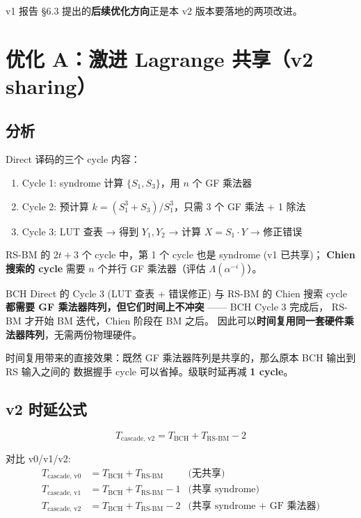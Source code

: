 \documentclass[11pt,a4paper]{article}
\begin{document}
v1 报告 §6.3 提出的\textbf{后续优化方向}正是本 v2 版本要落地的两项改进。

\section{优化 A：激进 Lagrange 共享（v2 sharing）}

\subsection{分析}

Direct 译码的三个 cycle 内容：
\begin{enumerate}[leftmargin=1.5em, itemsep=1pt]
\item Cycle 1: syndrome 计算 $\{S_1, S_3\}$，用 $n$ 个 GF 乘法器
\item Cycle 2: 预计算 $k = (S_1^3 + S_3)/S_1^3$，只需 3 个 GF 乘法 + 1 除法
\item Cycle 3: LUT 查表 → 得到 $Y_1, Y_2$ → 计算 $X = S_1 \cdot Y$ → 修正错误
\end{enumerate}

RS-BM 的 $2t+3$ 个 cycle 中，第 1 个 cycle 也是 syndrome (v1 已共享)；
\textbf{Chien 搜索的 cycle} 需要 $n$ 个并行 GF 乘法器（评估 $\Lambda(\alpha^{-i})$）。

\begin{keybox}[title=\textbf{v2 共享的核心观察}]
BCH Direct 的 Cycle 3 (LUT 查表 + 错误修正) 与 RS-BM 的 Chien 搜索 cycle
\textbf{都需要 GF 乘法器阵列，但它们时间上不冲突} —— BCH Cycle 3 完成后，
RS-BM 才开始 BM 迭代，Chien 阶段在 BM 之后。
因此可以\textbf{时间复用同一套硬件乘法器阵列}，无需两份物理硬件。
\end{keybox}

时间复用带来的直接效果：既然 GF 乘法器阵列是共享的，那么原本 BCH 输出到 RS 输入之间的
数据握手 cycle 可以省掉。级联时延再减 \textbf{1 cycle}。

\subsection{v2 时延公式}

\begin{equation}
T_{\text{cascade, v2}} = T_{\text{BCH}} + T_{\text{RS-BM}} - 2
\end{equation}

对比 v0/v1/v2:
\begin{align*}
T_{\text{cascade, v0}} &= T_{\text{BCH}} + T_{\text{RS-BM}} & \text{(无共享)} \\
T_{\text{cascade, v1}} &= T_{\text{BCH}} + T_{\text{RS-BM}} - 1 & \text{(共享 syndrome)} \\
T_{\text{cascade, v2}} &= T_{\text{BCH}} + T_{\text{RS-BM}} - 2 & \text{(共享 syndrome + GF 乘法器)}
\end{align*}
\end{document}
